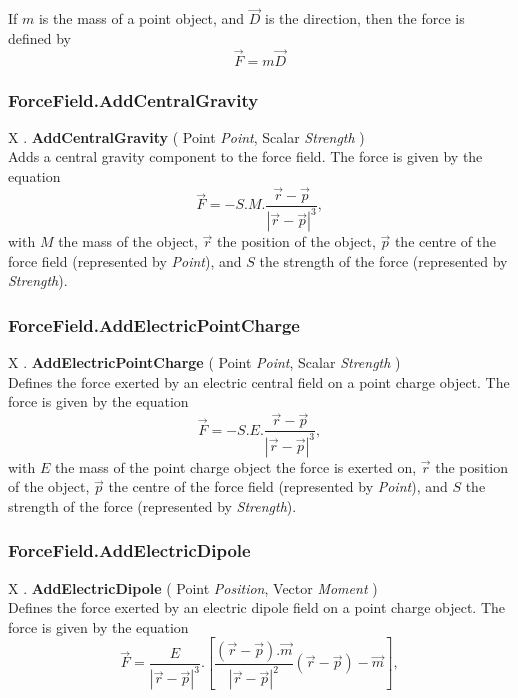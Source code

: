 \documentclass[10pt]{book}
\newcommand{\var}[1]{\textit{#1}}
\begin{document}
If $m$ is the mass of a point object, and $\vec{D}$ is the direction, then the force is defined by
\begin{equation}
\vec{F}=m \vec{D}
\end{equation}

\subsubsection{ForceField.AddCentralGravity \label{F:ForceField:AddCentralGravity}}
X . \textbf{AddCentralGravity} ( Point \textit{Point}, Scalar \textit{Strength} ) \\
Adds a central gravity component to the force field.
The force is given by the equation
\begin{equation}
\vec{F}= - S . M . \frac{\vec{r}-\vec{p}}{|\vec{r}-\vec{p}|^3},
\end{equation}
with $M$ the mass of the object, $\vec{r}$ the position of the object, $\vec{p}$ the centre of the force field (represented by \var{Point}), and $S$ the strength of the force (represented by \var{Strength}).


\subsubsection{ForceField.AddElectricPointCharge \label{F:ForceField:AddElectricPointCharge}}
X . \textbf{AddElectricPointCharge} ( Point \textit{Point}, Scalar \textit{Strength} ) \\
Defines the force exerted by an electric central field on a point charge object.
The force is given by the equation
\begin{equation}
\vec{F}= - S . E . \frac{\vec{r}-\vec{p}}{|\vec{r}-\vec{p}|^3},
\end{equation}
with $E$ the mass of the point charge object the force is exerted on, $\vec{r}$ the position of the object, $\vec{p}$ the centre of the force field (represented by \var{Point}), and $S$ the strength of the force (represented by \var{Strength}).


\subsubsection{ForceField.AddElectricDipole \label{F:ForceField:AddElectricDipole}}
X . \textbf{AddElectricDipole} ( Point \textit{Position}, Vector \textit{Moment} ) \\
Defines the force exerted by an electric dipole field on a point charge object.
The force is given by the equation
\begin{equation}
\vec{F}= \frac{E}{|\vec{r}-\vec{p}|^3} . 
\left[
 \frac{(\vec{r}-\vec{p}).\vec{m}}{|\vec{r}-\vec{p}|^2} (\vec{r}-\vec{p})
  - \vec{m} 
\right],
\end{equation}
\end{document}

